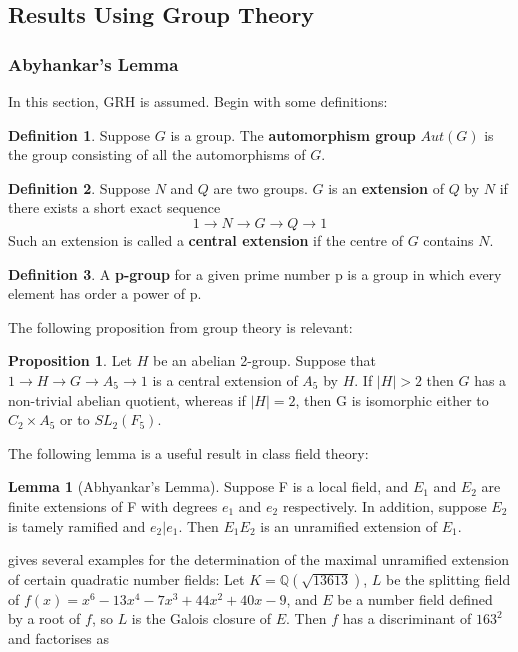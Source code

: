 \documentclass[12pt]{extarticle}
\newcommand{\Q}{\mathbb{Q}}
\newcommand{\<}{\langle}
\renewcommand{\>}{\rangle}
\theoremstyle{definition}
\newtheorem*{definition}{Definition}
\newtheorem{proposition}{Proposition}
\newtheorem{lemma}{Lemma}
\begin{document}
\subsection{Results Using Group Theory}
\subsubsection*{Abyhankar's Lemma}
In this section, GRH is assumed. 
Begin with some definitions:
\begin{definition}
Suppose $G$ is a group. The \textbf{automorphism group} $Aut(G)$ is the group consisting of all the automorphisms of $G$. 

\end{definition}

\begin{definition}
Suppose $N$ and $Q$ are two groups. $G$ is an \textbf{extension} of $Q$ by $N$ if there exists a short exact sequence 
\begin{equation}
1 \rightarrow N \rightarrow G \rightarrow Q \rightarrow 1 
\end{equation}
Such an extension is called a \textbf{central extension} if the centre of $G$ contains $N$. 
\end{definition}
\begin{definition}
A \textbf{p-group} for a given prime number p is a group in which every element has order a power of p.
\end{definition}
The following proposition from group theory is relevant:
\begin{proposition}
Let $H$ be an abelian 2-group. Suppose that $1 \rightarrow H \rightarrow G \rightarrow A_5 \rightarrow 1$ is a central extension of $A_5$ by $H$. If $|H| > 2$ then $G$ has a non-trivial abelian quotient, whereas if $|H|=2$, then G is isomorphic either to $C_2 \times A_5$ or to $SL_2(F_5)$.
\end{proposition}
The following lemma is a useful result in class field theory:
\begin{lemma}[Abhyankar's Lemma]
    Suppose F is a local field, and $E_1$ and $E_2$ are finite extensions of F with degrees $e_1$ and $e_2$ respectively. In addition, suppose $E_2$ is tamely ramified and $e_2|e_1$. Then $E_1E_2$ is an unramified extension of $E_1$.
 \end{lemma}
 \cite{KIM2017} gives several examples for the determination of the maximal unramified extension of certain quadratic number fields: 
Let $K= \Q(\sqrt{13613})$,  $L$ be the splitting field of $f(x)=x^6-13x^4-7x^3 +44x^2 +40x-9$, and $E$ be a number field defined by a root of $f$, so $L$ is the Galois closure of $E$. Then $f$ has a discriminant of $163^2$ and factorises as
\end{document}
